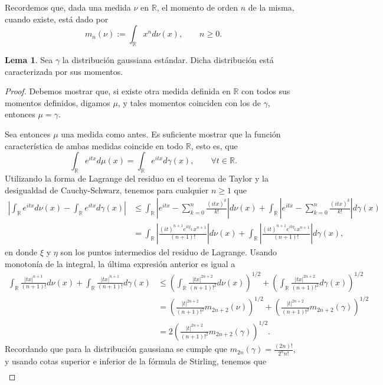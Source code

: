 \documentclass[letterpaper,twoside,12pt]{book}
\newcommand{\R}{\mathbb{R}}
\newcommand{\1}{\mathds{1}}
\newcommand{\abs}[1]{\left\lvert #1 \right\rvert}
\theoremstyle{definition}
\theoremstyle{definition}
\theoremstyle{remark}
\theoremstyle{definition}
\theoremstyle{definition}
\theoremstyle{definition}
\theoremstyle{definition}
\theoremstyle{definition}
\newtheorem{lema}{Lema}
\begin{document}
Recordemos que, dada una medida $\nu$ en $\R$, el momento de orden $n$ de la misma, cuando existe, está dado por 
\[
   m_n(\nu):=\int_{\R}x^{n}d\nu(x), \qquad n\geq0.
\]

\begin{lema} 
 Sea $\gamma$ la distribución gaussiana estándar. Dicha distribución está caracterizada por sus momentos.
 \end{lema}
 \begin{proof} 
    Debemos mostrar que, si existe otra medida definida en $\R$ con todos sus momentos definidos, digamos $\mu$, y  tales momentos coinciden con los de $\gamma$, entonces $\mu=\gamma$.

    Sea entonces $\mu$ una medida como antes. Es suficiente mostrar que la función característica de ambas medidas coincide en todo $\R$, esto es, que 
    \[
      \int_\R e^{itx}d\mu(x)=\int_\R e^{itx}d\gamma(x), \qquad \forall t\in \R.
    \]
    Utilizando la forma de Lagrange del residuo en el teorema de Taylor y la desigualdad de Cauchy-Schwarz, tenemos para cualquier $n\geq1$ que
    \begin{align*}
      \abs{\int_{\R}e^{itx}d\nu(x)-\int_\R e^{itx}d\gamma(x)}&\leq \int_\R \abs{e^{itx}-\sum_{k=0}^{n}\frac{(itx)^k}{k!}}d\nu(x)+\int_\R \abs{e^{itx}-\sum_{k=0}^{n}\frac{(itx)^k}{k!}}d\gamma(x)\\
      &=\int_\R \abs{\frac{(it)^{n+1}e^{it\xi_L}x^{n+1}}{(n+1)!}}d\nu(x)+\int_\R \abs{\frac{(it)^{n+1}e^{it\eta_L}x^{n+1}}{(n+1)!}}d\gamma(x),
   \end{align*}
   en donde $\xi$ y $\eta$ son los puntos intermedios del residuo de Lagrange.
   Usando monotonía de la integral, la última expresión anterior es igual a 
      \begin{align*}
      \int_\R \frac{\abs{tx}^{n+1}}{(n+1)!}d\nu(x)+\int_\R \frac{\abs{tx}^{n+1}}{(n+1)!}d\gamma(x)&\leq \left(\int_{\R}\frac{\abs{tx}^{2n+2}}{(n+1)!^2}d\nu(x)\right)^{1/2}+\left(\int_{\R}\frac{\abs{tx}^{2n+2}}{(n+1)!^2}d\gamma(x)\right)^{1/2}\\
      &=\left(\frac{\abs{t}^{2n+2}}{(n+1)!^2}m_{2n+2}(\nu)\right)^{1/2}+\left(\frac{\abs{t}^{2n+2}}{(n+1)!^2}m_{2n+2}(\gamma)\right)^{1/2}\\
      &=2\left(\frac{\abs{t}^{2n+2}}{(n+1)!^2}m_{2n+2}(\gamma)\right)^{1/2}.
    \end{align*}
   Recordando que para la distribución gaussiana se cumple que $m_{2n}(\gamma)=\frac{(2n)!}{2^{n}n!}$, y usando cotas superior e inferior de la fórmula de Stirling, tenemos que 
   \begin{align*}

\end{align*}
\end{proof}
\end{document}
